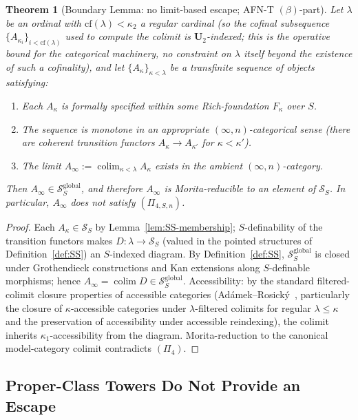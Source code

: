 \documentclass[11pt]{article}
\theoremstyle{plain}
\newtheorem{theorem}{Theorem}[section]
\theoremstyle{definition}
\newcommand{\cS}{\mathcal{S}}
\DeclareMathOperator{\colim}{colim}
\begin{document}
\begin{theorem}[Boundary Lemma: no limit-based escape; AFN-T $(\beta)$-part]\label{thm:afnt-beta}
Let $\lambda$ be an ordinal with $\mathrm{cf}(\lambda) < \kappa_2$ a regular cardinal (so the cofinal subsequence $\{A_{\kappa_i}\}_{i < \mathrm{cf}(\lambda)}$ used to compute the colimit is $\mathbf{U}_2$-indexed; this is the operative bound for the categorical machinery, no constraint on $\lambda$ itself beyond the existence of such a cofinality), and let $\{A_\kappa\}_{\kappa < \lambda}$ be a transfinite sequence of objects satisfying:
\begin{enumerate}[label=(\roman*)]
\item Each $A_\kappa$ is formally specified within some Rich-foundation $F_\kappa$ over $S$.
\item The sequence is monotone in an appropriate $(\infty, n)$-categorical sense (there are coherent transition functors $A_\kappa \to A_{\kappa'}$ for $\kappa < \kappa'$).
\item The limit $A_\infty := \colim_{\kappa < \lambda} A_\kappa$ exists in the ambient $(\infty, n)$-category.
\end{enumerate}
Then $A_\infty \in \cS_S^{\mathrm{global}}$, and therefore $A_\infty$ is Morita-reducible to an element of $\cS_S$. In particular, $A_\infty$ does not satisfy $(\Pi_{4, S, n})$.
\end{theorem}

\begin{proof}
Each $A_\kappa \in \cS_S$ by Lemma~\ref{lem:SS-membership}; $S$-definability of the transition functors makes $D : \lambda \to \cS_S$ (valued in the pointed structures of Definition~\ref{def:SS}) an $S$-indexed diagram. By Definition~\ref{def:SS}, $\cS_S^{\mathrm{global}}$ is closed under Grothendieck constructions and Kan extensions along $S$-definable morphisms; hence $A_\infty = \colim D \in \cS_S^{\mathrm{global}}$. Accessibility: by the standard filtered-colimit closure properties of accessible categories (Ad\'amek--Rosick\'y~\cite{AdamekRosicky1994}, particularly the closure of $\kappa$-accessible categories under $\lambda$-filtered colimits for regular $\lambda \leq \kappa$ and the preservation of accessibility under accessible reindexing), the colimit inherits $\kappa_1$-accessibility from the diagram. Morita-reduction to the canonical model-category colimit contradicts $(\Pi_4)$.
\end{proof}

\subsection{Proper-Class Towers Do Not Provide an Escape}
\end{document}
